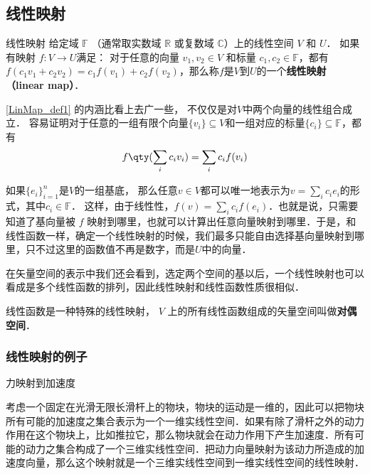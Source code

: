 


\subsection{线性映射}
\begin{definition}{线性映射}\label{LinMap_def1}
给定域 $\mathbb F$ （通常取实数域 $\mathbb R$ 或复数域 $\mathbb C$）上的线性空间 $V$ 和 $U$． 如果有映射 $f:V\rightarrow U$满足： 对于任意的向量 ${v}_1, {v}_2\in V$ 和标量 $c_1, c_2 \in \mathbb{F}$，都有$f(c_1 {v}_1+c_2 {v}_2)=c_1f({v}_1)+c_2f({v}_2)$，那么称$f$是$V$到$U$的一个\textbf{线性映射（linear map）}．
\end{definition}

\autoref{LinMap_def1} 的内涵比看上去广一些， 不仅仅是对$V$中两个向量的线性组合成立． 容易证明对于任意的一组有限个向量$\{{v}_i\}\subseteq V$和一组对应的标量$\{c_i\}\subseteq\mathbb{F}$，都有
\begin{equation}
f\qty(\sum_i c_i {v}_i)=\sum_i c_i f({v}_i)
\end{equation}

如果$\{{e}_i\}_{i=1}^n$是$V$的一组基底， 那么任意${v}\in V$都可以唯一地表示为${v}=\sum_i c_i {e}_i$的形式，其中$c_i\in\mathbb{F}$． 这样，由于线性性，$f({v})=\sum_ic_if({e}_i)$．也就是说，只需要知道了基向量被 $f$ 映射到哪里，也就可以计算出任意向量映射到哪里．于是，和线性函数一样，确定一个线性映射的时候，我们最多只能自由选择基向量映射到哪里，只不过这里的函数值不再是数字，而是$U$中的向量．

在矢量空间的表示中我们还会看到，选定两个空间的基以后，一个线性映射也可以看成是多个线性函数的排列，因此线性映射和线性函数性质很相似．

线性函数是一种特殊的线性映射， $V$ 上的所有线性函数组成的矢量空间叫做\textbf{对偶空间}．

\subsubsection{线性映射的例子}

\begin{example}{力映射到加速度}

考虑一个固定在光滑无限长滑杆上的物块，物块的运动是一维的，因此可以把物块所有可能的加速度之集合表示为一个一维实线性空间．如果有除了滑杆之外的动力作用在这个物块上，比如推拉它，那么物块就会在动力作用下产生加速度．所有可能的动力之集合构成了一个三维实线性空间．把动力向量映射为该动力所造成的加速度向量，那么这个映射就是一个三维实线性空间到一维实线性空间的线性映射．

\end{example}


